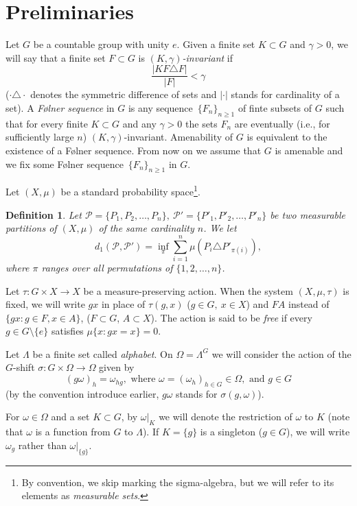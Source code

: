 \documentclass{amsart}
\newtheorem{defn}[thm]{Definition}
\theoremstyle{remark}
\def \P {\mathcal P}
\def \sq {sequence}
\def \inv {invariant}
\begin{document}
\section{Preliminaries}\label{S2}
Let $G$ be a countable group with unity $e$. Given a finite set $K\subset G$ and $\gamma>0$, we will say that a finite set $F\subset G$ is \emph{$(K,\gamma)$-\inv} if 
$$
\frac{|KF\triangle F|}{|F|}<\gamma
$$
($\cdot\triangle\cdot$ denotes the symmetric difference of sets and $|\cdot|$ stands for cardinality of a set).
A \emph{F\o lner \sq} in $G$ is any \sq\ $\{F_n\}_{n\ge1}$ of finte subsets of $G$ such that for every finite $K\subset G$ and any $\gamma>0$ the sets $F_n$ are eventually (i.e., for sufficiently large $n$) $(K,\gamma)$-\inv. Amenability of $G$ is equivalent to the existence of a F\o lner \sq. From now on we assume that $G$ is amenable and we fix some F\o lner \sq\ $\{F_n\}_{n\ge1}$ in $G$.
\smallskip

Let $(X,\mu)$ be a standard probability space\footnote{By convention, we skip marking the sigma-algebra, but we will refer to its elements as \emph{measurable sets}.}.
\begin{defn}\label{d1}
Let $\P=\{P_1,P_2,\dots,P_n\},\ \P'=\{P'_1,P'_2,\dots,P'_n\}$ be two measurable partitions of $(X,\mu)$ of the same cardinality $n$. We let
$$
d_1(\P,\P')=\inf_\pi\sum_{i=1}^n \mu(P_i\triangle P'_{\pi(i)}),
$$
where $\pi$ ranges over all permutations of $\{1,2,\dots,n\}$.
\end{defn}
 
Let $\tau:G\times X\to X$  be a measure-preserving action. When the system $(X,\mu,\tau)$ is fixed, we will write $gx$ in place of $\tau(g,x)$ ($g\in G,\ x\in X$) and $FA$ instead of $\{gx:g\in F, x\in A\}$, ($F\subset G$, $A\subset X$). The action is said to be \emph{free} if every $g\in G\setminus\{e\}$ satisfies $\mu\{x:gx=x\}=0$.
\smallskip

Let $\Lambda$ be a finite set called \emph{alphabet}. On $\Omega=\Lambda^G$ we will consider the action of the $G$-shift $\sigma:G\times\Omega\to\Omega$ given by
$$
(g\omega)_h=\omega_{hg}, \text{ where } \omega=(\omega_h)_{h\in G}\in\Omega,\text{ and } g\in G
$$
(by the convention introduce earlier, $g\omega$ stands for $\sigma(g,\omega)$). 
\smallskip

For $\omega\in\Omega$ and a set $K\subset G$, by $\omega|_K$ we will denote the restriction of $\omega$ to $K$ (note that $\omega$ is a function from $G$ to $\Lambda$). If $K=\{g\}$ is a singleton ($g\in G$), we will write $\omega_g$ rather than $\omega|_{\{g\}}$.
\end{document}
